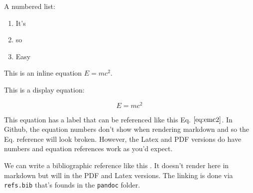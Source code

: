 \documentclass[
]{article}
\renewcommand{\[}{\begin{equation}}
\renewcommand{\]}{\end{equation}}
\providecommand{\tightlist}{%
  \setlength{\itemsep}{0pt}\setlength{\parskip}{0pt}}
\begin{document}
A numbered list:

\begin{enumerate}
\def\labelenumi{\arabic{enumi}.}
\tightlist
\item
  It's
\item
  so
\item
  Easy
\end{enumerate}

This is an inline equation \(E=mc^2\).

This is a display equation:

\[
E = mc^2
\label{eq:emc2}
\]

This equation has a label that can be referenced like this Eq.
\(\ref{eq:emc2}\). In Github, the equation numbers don't show when
rendering markdown and so the Eq. reference will look broken. However,
the Latex and PDF versions do have numbers and equation references work
as you'd expect.

We can write a bibliographic reference like this
\autocite{einstein1905}. It doesn't render here in markdown but will in
the PDF and Latex versions. The linking is done via \texttt{refs.bib}
that's founds in the \texttt{pandoc} folder.

\printbibliography
\end{document}
